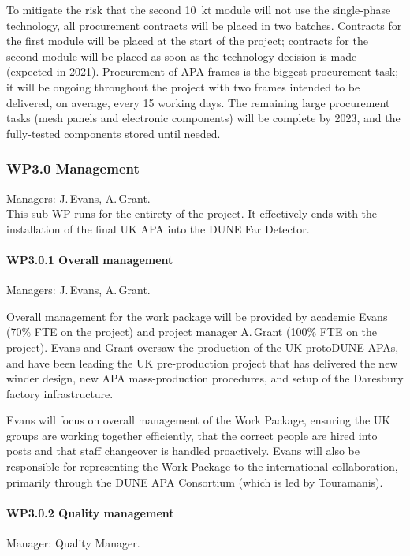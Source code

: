 To mitigate the risk that the second \SI{10}{\kilo\tonne} module will not use the single-phase technology, all procurement contracts will be placed in two batches. Contracts for the first module will be placed at the start of the project; contracts for the second module will be placed as soon as the technology decision is made (expected in 2021). Procurement of APA frames is the biggest procurement task; it will be ongoing throughout the project with two frames intended to be delivered, on average, every 15 working days.  The remaining large procurement tasks (mesh panels and electronic components) will be complete by 2023, and the fully-tested components stored until needed.

\subsubsection{WP3.0 Management}

Managers: J.\,Evans, A.\,Grant.\\
This sub-WP runs for the entirety of the project. It effectively ends with the installation of the final UK APA into the DUNE Far Detector.

\paragraph{WP3.0.1 Overall management} Managers: J.\,Evans, A.\,Grant.

Overall management for the work package will be provided by academic Evans (70\% FTE on the project) and project manager A.\,Grant (100\% FTE on the project). Evans and Grant oversaw the production of the UK protoDUNE APAs, and have been leading the UK pre-production project that has delivered the new winder design, new APA mass-production procedures, and setup of the Daresbury factory infrastructure. 

Evans will focus on overall management of the Work Package, ensuring the UK groups are working together efficiently, that the correct people are hired into posts and that staff changeover is handled proactively. Evans will also be responsible for representing the Work Package to the international collaboration, primarily through the DUNE APA Consortium (which is led by Touramanis).

\paragraph{WP3.0.2 Quality management} Manager: Quality Manager.

